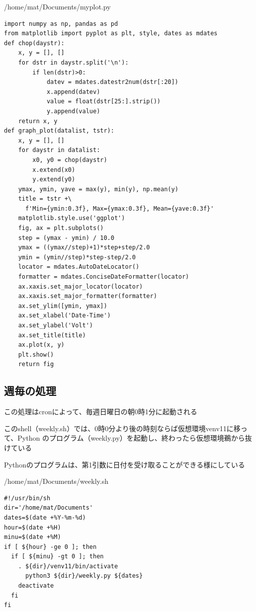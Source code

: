 \documentclass[12pt,a4j]{jsbook}
\begin{document}
\begin{spacing}{0.95}
\begin{itembox}[l]{/home/mat/Documents/myplot.py}
\begin{verbatim}
import numpy as np, pandas as pd
from matplotlib import pyplot as plt, style, dates as mdates
def chop(daystr):
    x, y = [], []
    for dstr in daystr.split('\n'):
        if len(dstr)>0:
            datev = mdates.datestr2num(dstr[:20])
            x.append(datev)
            value = float(dstr[25:].strip())
            y.append(value)
    return x, y
def graph_plot(datalist, tstr):
    x, y = [], []
    for daystr in datalist:
        x0, y0 = chop(daystr)
        x.extend(x0)
        y.extend(y0)
    ymax, ymin, yave = max(y), min(y), np.mean(y)
    title = tstr +\
      f'Min={ymin:0.3f}, Max={ymax:0.3f}, Mean={yave:0.3f}'
    matplotlib.style.use('ggplot')
    fig, ax = plt.subplots()
    step = (ymax - ymin) / 10.0
    ymax = ((ymax//step)+1)*step+step/2.0
    ymin = (ymin//step)*step-step/2.0
    locator = mdates.AutoDateLocator()
    formatter = mdates.ConciseDateFormatter(locator)
    ax.xaxis.set_major_locator(locator)
    ax.xaxis.set_major_formatter(formatter)
    ax.set_ylim([ymin, ymax])
    ax.set_xlabel('Date-Time')
    ax.set_ylabel('Volt')
    ax.set_title(title)
    ax.plot(x, y)
    plt.show()
    return fig
\end{verbatim}
\end{itembox}
\end{spacing}


\newpage

\subsection{週毎の処理}

この処理はcronによって、毎週日曜日の朝0時1分に起動される

このshell（weekly.sh）では、0時0分より後の時刻ならば仮想環境venv11に移って、Python のプログラム（weekly.py）を起動し、終わったら仮想環境鵜から抜けている

Pythonのプログラムは、第1引数に日付を受け取ることができる様にしている

\begin{spacing}{0.95}
\begin{itembox}[l]{/home/mat/Documents/weekly.sh}
\begin{verbatim}
#!/usr/bin/sh
dir='/home/mat/Documents'
dates=$(date +%Y-%m-%d)
hour=$(date +%H)
minu=$(date +%M)
if [ ${hour} -ge 0 ]; then
  if [ ${minu} -gt 0 ]; then
    . ${dir}/venv11/bin/activate
      python3 ${dir}/weekly.py ${dates}
    deactivate
  fi
fi
\end{verbatim}
\end{itembox}
\end{spacing}
\end{document}
